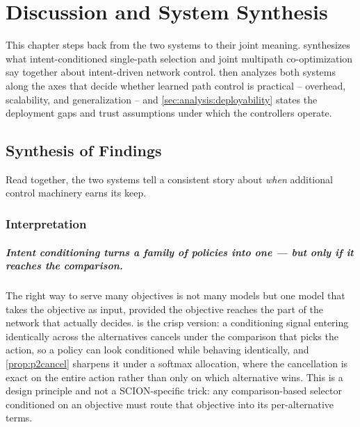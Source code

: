 \chapter{Discussion and System Synthesis}
\label{ch:synthesis}

This chapter steps back from the two systems to their joint meaning.  synthesizes
what intent-conditioned single-path selection and joint multipath co-optimization say together about
intent-driven network control.  then analyzes both systems along the axes that decide
whether learned path control is practical -- overhead, scalability, and generalization -- and
\cref{sec:analysis:deployability} states the deployment gaps and trust assumptions under which the
controllers operate.

\section{Synthesis of Findings}
\label{sec:discussion}

Read together, the two systems tell a consistent story about \emph{when} additional control machinery
earns its keep.

\subsection{Interpretation}
\label{sec:disc:interpretation}

\paragraph{Intent conditioning turns a family of policies into one --- but only if it reaches the
comparison.} The right way to serve many objectives is not many models but one model that takes the
objective as input, provided the objective reaches the part of the network that actually decides.
 is the crisp version: a conditioning signal entering identically across the
alternatives cancels under the comparison that picks the action, so a policy can look conditioned while
behaving identically, and \cref{prop:p2cancel} sharpens it under a softmax allocation, where the
cancellation is exact on the entire action rather than only on which alternative wins. This is a design
principle and not a SCION-specific trick: any comparison-based selector conditioned on an objective must
route that objective into its per-alternative terms.


